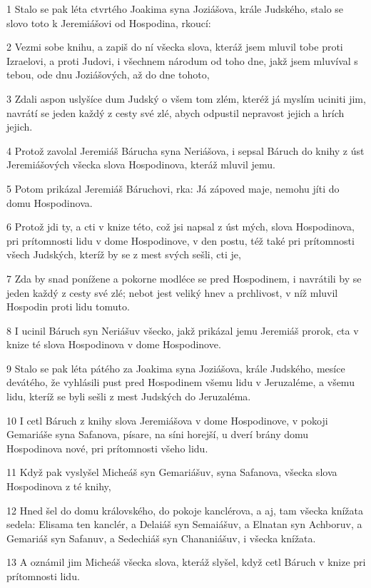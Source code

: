 \par 1 Stalo se pak léta ctvrtého Joakima syna Joziášova, krále Judského, stalo se slovo toto k Jeremiášovi od Hospodina, rkoucí:
\par 2 Vezmi sobe knihu, a zapiš do ní všecka slova, kteráž jsem mluvil tobe proti Izraelovi, a proti Judovi, i všechnem národum od toho dne, jakž jsem mluvíval s tebou, ode dnu Joziášových, až do dne tohoto,
\par 3 Zdali aspon uslyšíce dum Judský o všem tom zlém, kteréž já myslím uciniti jim, navrátí se jeden každý z cesty své zlé, abych odpustil nepravost jejich a hrích jejich.
\par 4 Protož zavolal Jeremiáš Bárucha syna Neriášova, i sepsal Báruch do knihy z úst Jeremiášových všecka slova Hospodinova, kteráž mluvil jemu.
\par 5 Potom prikázal Jeremiáš Báruchovi, rka: Já zápoved maje, nemohu jíti do domu Hospodinova.
\par 6 Protož jdi ty, a cti v knize této, což jsi napsal z úst mých, slova Hospodinova, pri prítomnosti lidu v dome Hospodinove, v den postu, též také pri prítomnosti všech Judských, kteríž by se z mest svých sešli, cti je,
\par 7 Zda by snad ponížene a pokorne modléce se pred Hospodinem, i navrátili by se jeden každý z cesty své zlé; nebot jest veliký hnev a prchlivost, v níž mluvil Hospodin proti lidu tomuto.
\par 8 I ucinil Báruch syn Neriášuv všecko, jakž prikázal jemu Jeremiáš prorok, cta v knize té slova Hospodinova v dome Hospodinove.
\par 9 Stalo se pak léta pátého za Joakima syna Joziášova, krále Judského, mesíce devátého, že vyhlásili pust pred Hospodinem všemu lidu v Jeruzaléme, a všemu lidu, kteríž se byli sešli z mest Judských do Jeruzaléma.
\par 10 I cetl Báruch z knihy slova Jeremiášova v dome Hospodinove, v pokoji Gemariáše syna Safanova, písare, na síni horejší, u dverí brány domu Hospodinova nové, pri prítomnosti všeho lidu.
\par 11 Když pak vyslyšel Micheáš syn Gemariášuv, syna Safanova, všecka slova Hospodinova z té knihy,
\par 12 Hned šel do domu královského, do pokoje kanclérova, a aj, tam všecka knížata sedela: Elisama ten kanclér, a Delaiáš syn Semaiášuv, a Elnatan syn Achboruv, a Gemariáš syn Safanuv, a Sedechiáš syn Chananiášuv, i všecka knížata.
\par 13 A oznámil jim Micheáš všecka slova, kteráž slyšel, když cetl Báruch v knize pri prítomnosti lidu.
